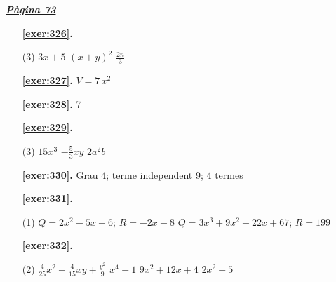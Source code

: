 \hyperlink{page.73}{\textbf{\em Pàgina 73}}
\begin{enumerate}



 \item[\fontfamily{phv}\selectfont\color{blue}\textbf{\ref{exer:326}. }] \label{ans:326}
 \begin{tasks}[column-sep=1em, item-indent=1.3333em](3)
	 \task $3x+5$
	 \task $(x+y)^2$
	 \task $\frac {2n}{3}$
\end{tasks}
 \end{enumerate}
\begin{enumerate}
\item[\fontfamily{phv}\selectfont\color{blue}\textbf{\ref{exer:327}. }] \label{ans:327} 
$V=7\,x^2$
\item[\fontfamily{phv}\selectfont\color{blue}\textbf{\ref{exer:328}. }] \label{ans:328} 
7



 \item[\fontfamily{phv}\selectfont\color{blue}\textbf{\ref{exer:329}. }] \label{ans:329}
 \begin{tasks}[column-sep=1em, item-indent=1.3333em](3)
	 \task $15x^3$
	 \task $-\frac {5}{3}xy$
	 \task $2a^2 b$
\end{tasks}
\item[\fontfamily{phv}\selectfont\color{blue}\textbf{\ref{exer:330}. }] \label{ans:330} 
Grau 4; terme independent 9; 4 termes



 \item[\fontfamily{phv}\selectfont\color{blue}\textbf{\ref{exer:331}. }] \label{ans:331}
 \begin{tasks}[column-sep=1em, item-indent=1.3333em](1)
	 \task $Q=2x^2-5x+6$; $R=-2x-8$
	 \task $Q=3x^3+9x^2+22x+67$; $R=199$
\end{tasks}



 \item[\fontfamily{phv}\selectfont\color{blue}\textbf{\ref{exer:332}. }] \label{ans:332}
 \begin{tasks}[column-sep=1em, item-indent=1.3333em](2)
	 \task* $\frac {4}{25}x^2 - \frac {4}{15}xy + \frac {y^2}{9}$
	 \task $x^4 - 1$
	 \task $9x^2+12x+4$
	 \task $2x^2 -5$
\end{tasks}



\end{enumerate}

